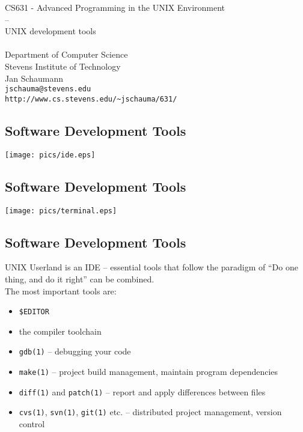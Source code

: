 \documentclass[xga]{xdvislides}
\begin{document}
\setfontphv

\lhead{\slidetitle}
\cfoot{\relax}
\rfoot{\Gray{\today}}

\vspace*{\fill}
\begin{center}
	\Hugesize
		CS631 - Advanced Programming in the UNIX Environment\\
		-- \\
		UNIX development tools \\
	\hspace*{5mm}\blueline\\ [1em]
	\Normalsize
		Department of Computer Science\\
		Stevens Institute of Technology\\
		Jan Schaumann\\
		\verb+jschauma@stevens.edu+\\
		\verb+http://www.cs.stevens.edu/~jschauma/631/+
\end{center}
\vspace*{\fill}

\subsection{Software Development Tools}
\begin{center}
	\texttt{[image: pics/ide.eps]}
\end{center}

\subsection{Software Development Tools}
\begin{center}
	\texttt{[image: pics/terminal.eps]}
\end{center}

\subsection{Software Development Tools}
UNIX Userland is an IDE -- essential tools that follow the paradigm of ``Do
one thing, and do it right'' can be combined. \\

The most important tools are:
\begin{itemize}
	\item \verb+$EDITOR+
	\item the compiler toolchain
	\item {\tt gdb(1)} -- debugging your code
	\item {\tt make(1)} -- project build management, maintain program
		dependencies
	\item {\tt diff(1)} and {\tt patch(1)} -- report and apply differences
		between files
	\item {\tt cvs(1)}, {\tt svn(1)}, {\tt git(1)} etc. -- distributed project management,
		 version control
\end{itemize}
\end{document}
